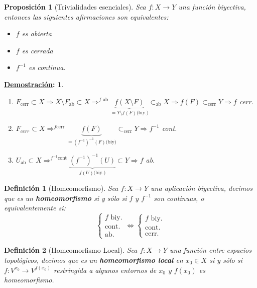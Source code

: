 \documentclass[10pt,a4paper,openright]{book}
\theoremstyle{break}
\newtheorem*{defi}{Definición}
\newtheorem*{prop}{Proposición}
\newtheorem*{demo}{\underline{Demostración}:}
\begin{document}
\begin{prop}[Trivialidades esenciales]
Sea $f:X\rightarrow Y$ una función biyectiva, entonces las siguientes afirmaciones son equivalentes:
\begin{itemize}
    \item $f$ es abierta
    \item $f$ es cerrada
    \item $f^{-1}$ es continua.
\end{itemize}
\end{prop}
\begin{demo}
\begin{enumerate}
    \item $F_{\text{cerr}} \subset X \Rightarrow X\setminus F_{\text{ab}} \subset X \Rightarrow^{ f\text{ ab}} \underbrace{f\left( X\setminus F \right)}_{= Y\setminus f\left( F \right) \text{(biy.)}} \subset_{\text{ab}} X \Rightarrow f\left( F \right) \subset_{\text{cerr}} Y \Rightarrow f$ cerr.

    \item $F_{cerr} \subset X \Rightarrow^{f \text{cerr}} \underbrace{f\left( F \right)}_{= \left( f^{-1} \right)^{-1} \left( F \right) \text{(biy)}} \subset_{\text{cerr}} Y \Rightarrow f^{-1}$ cont.

    \item $U_{\text{ab}} \subset X \Rightarrow^{f^{-1} \text{cont}} \underbrace{\left( f^{-1} \right) ^{-1} \left( U \right) }_{f\left( U \right) \text{(biy.)}} \subset Y \Rightarrow f$ ab.
\end{enumerate}
\end{demo}

\begin{defi}[Homeomorfismo]
Sea $f: X \rightarrow Y$ una aplicación biyectiva, decimos que es un \textbf{homeomorfismo} si y sólo si $f$ y $f^{-1}$ son continuas, o equivalentemente si:
    \[
    \begin{cases}
        f \text{ biy.}\\
        \text{cont.}\\
        \text{ab.} 
    \end{cases} \Leftrightarrow \begin{cases}
        f \text{ biy.}\\
        \text{cont.}\\
        \text{cerr.}
    \end{cases} 
    \]
\end{defi}

\begin{defi}[Homeomorfismo Local]
Sea $f: X \rightarrow Y$ una función entre espacios topológicos, decimos que es un \textbf{homeomorfismo local} en $x_0 \in X$ si y sólo si $f: V^{x_0} \rightarrow V^{f\left( x_0 \right)}$ restringida a algunos entornos de $x_0$ y $f\left( x_0 \right)$ es homeomorfismo.
\end{defi}
\end{document}
